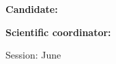 \begin{titlepage}
\thispagestyle{titlepagestyle}
    \begin{center}
        \vspace*{\fill}
        \textbf{\fontsize{20pt}{30pt} \selectfont \MakeUppercase{\thesisTitle}}
    \end{center}
    
    \vspace*{\fill}
     
            
    \textbf{\fontsize{14pt}{16pt} \selectfont Candidate: \candidateName}
    
    \vspace{14pt}
    
    \textbf{\fontsize{14pt}{16pt} \selectfont Scientific coordinator: \coordinator}

    \begin{center}
        \vspace{50pt}
        \fontsize{14pt}{16pt} \selectfont Session: June \academicYear 
    \end{center}
    

\end{titlepage}